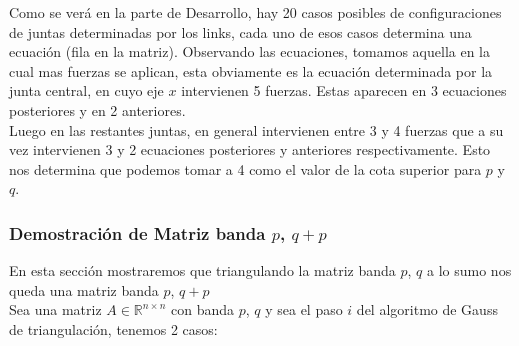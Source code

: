 Como se verá en la parte de Desarrollo, hay 20 casos posibles de configuraciones de juntas determinadas por los links, cada uno de esos casos determina una ecuación (fila en la matriz). Observando las ecuaciones, tomamos aquella en la cual mas fuerzas se aplican, esta obviamente es la ecuación determinada por la junta central, en cuyo eje $x$ intervienen 5 fuerzas. Estas aparecen en 3 ecuaciones posteriores y en 2 anteriores.\\

Luego en las restantes juntas, en general intervienen entre 3 y 4 fuerzas que a su vez intervienen 3 y 2 ecuaciones posteriores y anteriores respectivamente. Esto nos determina que podemos tomar a 4 como el valor de la cota superior para $p$ y $q$.

\subsubsection{Demostración de Matriz banda $p$, $q + p$}

En esta sección mostraremos que triangulando la matriz banda $p$, $q$ a lo sumo nos queda una matriz banda $p$, $q + p$\\

Sea una matriz $A \in \mathbb{R}^{n \times n}$ con banda $p$, $q$ y sea el paso $i$ del algoritmo de Gauss de triangulación, tenemos 2 casos:

